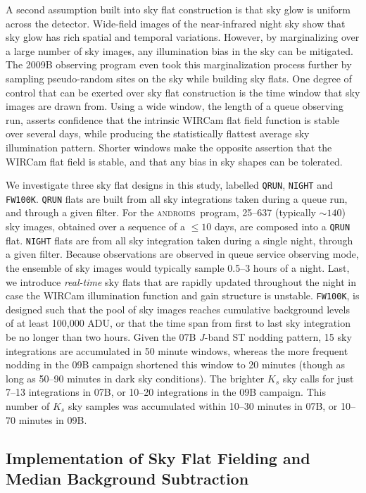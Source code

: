 \documentclass[iop]{emulateapj}
\newcommand{\androids}{\textsc{androids}}
\begin{document}
A second assumption built into sky flat construction is that sky glow is uniform across the detector.
Wide-field images of the near-infrared night sky show that sky glow has rich spatial and temporal variations.
However, by marginalizing over a large number of sky images, any illumination bias in the sky can be mitigated.
The 2009B observing program even took this marginalization process further by sampling pseudo-random sites on the sky while building sky flats. One degree of control that can be exerted over sky flat construction is the time window that sky images are drawn from.
Using a wide window, the length of a queue observing run, asserts confidence that the intrinsic WIRCam flat field function is stable over several days, while producing the statistically flattest average sky illumination pattern.
Shorter windows make the opposite assertion that the WIRCam flat field is stable, and that any bias in sky shapes can be tolerated.

We investigate three sky flat designs in this study, labelled \texttt{QRUN}, \texttt{NIGHT} and \texttt{FW100K}.
\texttt{QRUN} flats are built from all sky integrations taken during a queue run, and through a given filter.
For the \androids\ program, 25--637 (typically $\sim 140$) sky images, obtained over a sequence of a $\leq 10$ days, are composed into a \texttt{QRUN} flat.
\texttt{NIGHT} flats are from all sky integration taken during a single night, through a given filter.
Because observations are observed in queue service observing mode, the ensemble of sky images would typically sample 0.5--3 hours of a night.
Last, we introduce \emph{real-time} sky flats that are rapidly updated throughout the night in case the WIRCam illumination function and gain structure is unstable.
\texttt{FW100K}, is designed such that the pool of sky images reaches cumulative background levels of at least 100,000 ADU, or that the time span from first to last sky integration be no longer than two hours.
Given the 07B $J$-band ST nodding pattern, 15 sky integrations are accumulated in 50 minute windows, whereas the more frequent nodding in the 09B campaign shortened this window to 20 minutes (though as long as 50--90 minutes in dark sky conditions).
The brighter $K_s$ sky calls for just 7--13 integrations in 07B, or 10--20 integrations in the 09B campaign.
This number of $K_s$ sky samples was accumulated within 10--30 minutes in 07B, or 10--70 minutes in 09B.

\subsection{Implementation of Sky Flat Fielding and Median Background Subtraction}
\label{sec:flatbuilding}
\end{document}
